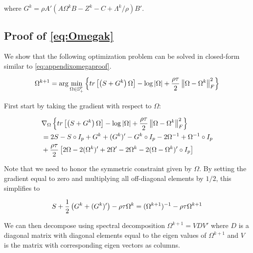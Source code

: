 \documentclass[11pt,]{report}
\theoremstyle{definition}
\theoremstyle{definition}
\theoremstyle{definition}
\theoremstyle{remark}
\begin{document}
where \(G^{k} = \rho A'(A\Omega^{k}B - Z^{k} - C + \Lambda^{k}/\rho)B'\).

\hypertarget{proofOmegak}{%
\subsection{Proof of \eqref{eq:Omegak}}\label{proofOmegak}}

We show that the following optimization problem can be solved in closed-form similar to \eqref{eq:appendixomegaproof}.

\begin{equation}
\Omega^{k + 1} = \arg\min_{\Omega \in \mathbb{S}_{+}^{p}}\left\{tr\left[\left(S + G^{k}\right)\Omega\right] - \log\left|\Omega\right| + \frac{\rho\tau}{2}\left\|\Omega - \Omega^{k}\right\|_{F}^{2} \right\}
\label{eq:appendixomegaloglik2}\notag
\end{equation}

First start by taking the gradient with respect to \(\Omega\):

\begin{equation}
\begin{split}
  &\nabla_{\Omega}\left\{tr\left[\left(S + G^{k}\right)\Omega\right] - \log\left|\Omega\right| + \frac{\rho\tau}{2}\left\|\Omega - \Omega^{k}\right\|_{F}^{2} \right\} \\
  &= 2S - S\circ I_{p} + G^{k} + (G^{k})' - G^{k}\circ I_{p} - 2\Omega^{-1} + \Omega^{-1}\circ I_{p} \\
  &+ \frac{\rho\tau}{2}\left[2\Omega - 2(\Omega^{k})' + 2\Omega' - 2\Omega^{k} - 2(\Omega - \Omega^{k})'\circ I_{p} \right]
\end{split}
\label{eq:appendixomegagradient2}\notag
\end{equation}

Note that we need to honor the symmetric constraint given by \(\Omega\). By setting the gradient equal to zero and multiplying all off-diagonal elements by \(1/2\), this simplifies to

\begin{equation}
S + \frac{1}{2}\left(G^{k} + (G^{k})'\right) - \rho\tau\Omega^{k} = (\Omega^{k + 1})^{-1} - \rho\tau\Omega^{k + 1} \notag
\end{equation}

We can then decompose using spectral decomposition \(\Omega^{k + 1} = VDV'\) where \(D\) is a diagonal matrix with diagonal elements equal to the eigen values of \(\Omega^{k + 1}\) and \(V\) is the matrix with corresponding eigen vectors as columns.
\end{document}
